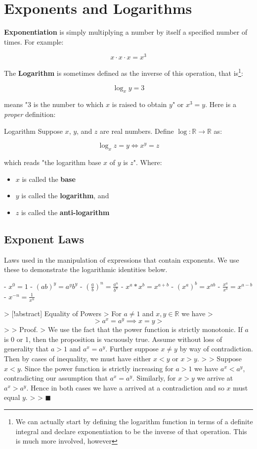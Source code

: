 \documentclass{standalone}
\begin{document}
\section{Exponents and Logarithms}

\textbf{Exponentiation} is simply multiplying a number by itself a specified
number of times. For example:

\[
  x \cdot x \cdot x = x^3
\]

The \textbf{Logarithm} is sometimes defined as the inverse of this operation,
that is\footnote{We can actually start by defining the logarithm function in
terms of a definite integral and declare exponentiation to be the inverse of
that operation. This is much more involved, however}:

\[
  \log_x y = 3
\]

means "3 is the number to which $x$ is raised to obtain $y$" or $x^3 = y$. Here
is a \emph{proper} definition:

\begin{definition} Logarithm
  Suppose $x$, $y$, and $z$ are real numbers. Define $\log : \mathbb{R} \to \mathbb{R}$
  as:

  \[
    \log_x z = y \iff x^y = z
  \]

  which reads "the logarithm base $x$ of $y$ is $z$". Where:

  \begin{itemize}
    \item $x$ is called the \textbf{base}
    \item $y$ is called the \textbf{logarithm}, and
    \item $z$ is called the \textbf{anti-logarithm}
  \end{itemize}
\end{definition}

\subsection{Exponent Laws}

Laws used in the manipulation of expressions that contain exponents. We use these to demonstrate the logarithmic identities below.

- $x^0 = 1$
- $(ab)^y = a^yb^y$
- $(\frac a b)^n = \frac {a^n} {b^n}$
- $x^a * x^b = x^{a + b}$
- $(x^a)^b = x^{ab}$
- $\frac {x^a} {x^b} = x^{a-b}$
- $x^{-n} = \frac 1 {x^n}$

> [!abstract] Equality of Powers
> For $a \neq 1$ and $x,y \in \mathbb{R}$ we have
> $$
> a^x = a^y \implies x = y
> $$
>
> Proof.
> We use the fact that the power function is strictly monotonic. If $a$ is 0 or 1, then the proposition is vacuously true. Assume without loss of generality that $a \gt 1$ and $a^x = a^y$. Further suppose $x \neq y$ by way of contradiction. Then by cases of inequality, we must have either $x \lt y$ or $x \gt y$.
>
> Suppose $x \lt y$. Since the power function is strictly increasing for $a \gt 1$ we have $a^x < a^y$, contradicting our assumption that $a^x = a^y$. Similarly, for $x \gt y$ we arrive at $a^x \gt a^y$. Hence in both cases we have a arrived at a contradiction and so $x$ must equal $y$.
>
> $\blacksquare$
\end{document}
